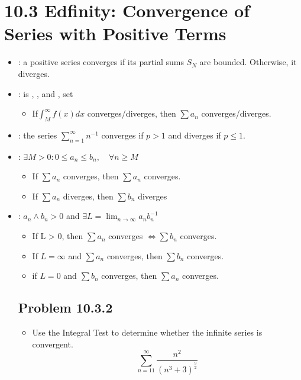 \section{10.3 Edfinity: Convergence of Series with Positive Terms}
\begin{itemize}
  \item {}:  a positive series
      converges if its partial sums \(S_N\) are bounded. Otherwise, it diverges.
  \item {}:  is , , and
    , set 
    \begin{itemize}
      \item If\(\int_{M}^{\infty} f (x) dx \) converges/diverges, then \(\sum
        a_n\) converges/diverges.
    \end{itemize}

  \item {}: the series \(\sum_{n=1}^{\infty} n^{-1}\)
    converges if \(p>1\) and diverges if \(p \leq 1\).

  \item {}: \(\exists M > 0 : 0 \leq a_n \leq b_n, \quad\forall n \geq M\)
    \begin{itemize}
      \item If \(\sum a_n\) converges, then \(\sum a_n\) converges.
      \item  If \(\sum a_n\) diverges, then \(\sum b_n\) diverges
    \end{itemize}

  \item {}: \({a_n} \land {b_n} > 0\) and \(\exists L = \lim_{n \to \infty} a_n b_n^{-1}\)
    \begin{itemize}
      \item If L > 0, then \(\sum a_n\) converges \(\iff \sum b_n\) converges.
      \item If \(L=\infty\) and \(\sum a_n\) converges, then \(\sum b_n\) converges.
      \item if \(L = 0\) and \(\sum b_n\) converges, then \(\sum a_n\) converges.
    \end{itemize}

    \subsection{Problem 10.3.2}
    \begin{itemize}
      \item Use the Integral Test to determine whether the infinite series is
        convergent.
        \[%
          \sum_{n=11}^{\infty} \frac{n^2}{(n^3 + 3)^{\frac{9}{2}}}
        \]%
    \end{itemize}

\end{itemize}
